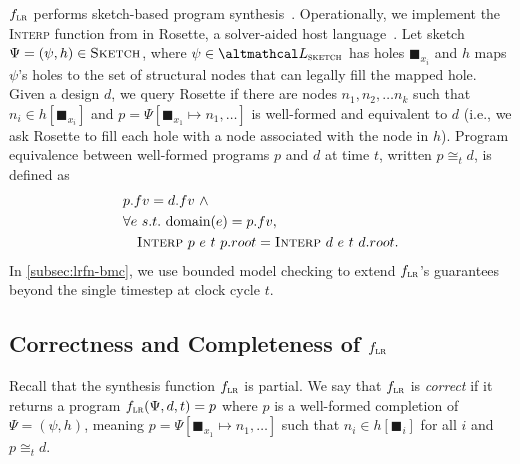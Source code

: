 $\text{$f_{\textsc{lr}}$}$ performs sketch-based program
  synthesis~\cite{solar2008program}.
Operationally, we implement
  the \textsc{Interp} function from 
  in Rosette, a solver-aided host
  language~\cite{torlak2014lightweight}.
Let sketch $\Psi = (\psi, h) \in \textsc{Sketch}$, where
  $\psi \in \SketchLang$ has holes
  $\blacksquare_{x_{i}}$
  and $h$ maps $\psi$'s holes
  to the set of structural nodes
  that can legally fill the mapped hole.
Given a design $d$,
  we query Rosette if there
  are nodes 
  $n_1, n_2, \ldots n_k$ 
  such that 
  $n_i \in h[\blacksquare_{x_i}]$
  and
  $p = \Psi[\blacksquare_{x_1} \mapsto n_1, \ldots]$
   is well-formed and equivalent to $d$
   (i.e., we ask Rosette to fill
   each hole with a node associated with the node in $h$).
Program equivalence between well-formed
  programs $p$ and $d$ at time
  $t$, written $p\cong_t d$, is defined as
  \begin{align*}
    & p.fv = d.fv\ \wedge \\
    &\forall e\ s.t.\ \textrm{domain}(e) = p.fv, \\
    &\quad\textsc{Interp}\ p\ e\ t\ p.root =
   \textsc{Interp}\ d\ e\ t\ d.root.
  \end{align*}
In \cref{subsec:lrfn-bmc}, we
  use bounded model checking to
  extend $\text{$f_{\textsc{lr}}$}$'s guarantees
  beyond the single timestep
  at clock cycle $t$.
  

\subsection{Correctness and Completeness of $\text{$f_{\textsc{lr}}$}$}
\label{subsec:lr-correctness-and-completeness}

Recall that the synthesis
  function $\text{$f_{\textsc{lr}}$}$ is partial.
We say that $\text{$f_{\textsc{lr}}$}$
  is \emph{correct} if
  it 
  returns a program
  $\text{$f_{\textsc{lr}}$}(\Psi,d,t) = p$  where
  $p$ is
  a well-formed
  completion of $\Psi = (\psi, h)$,
  meaning $p = \Psi[\blacksquare_{x_1} \mapsto n_1, \ldots]$
            such that $n_i \in h[\blacksquare_i]$ for all $i$
  and $p\cong_t d$.

